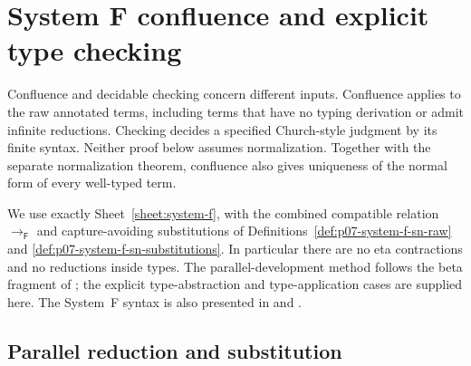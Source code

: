 \section{System F confluence and explicit type checking}
\label{sec:p07-system-f-confluence-and-checking}

Confluence and decidable checking concern different inputs. Confluence
applies to the raw annotated terms, including terms that have no typing
derivation or admit infinite reductions. Checking decides a specified
Church-style judgment by its finite syntax. Neither proof below assumes
normalization. Together with the separate normalization theorem, confluence
also gives uniqueness of the normal form of every well-typed term.

We use exactly Sheet~\ref{sheet:system-f}, with the combined compatible
relation \(\to_{\mathsf F}\) and capture-avoiding substitutions of
Definitions~\ref{def:p07-system-f-sn-raw} and
\ref{def:p07-system-f-sn-substitutions}. In particular there are no eta
contractions and no reductions inside types. The parallel-development
method follows the beta fragment of
\cite[Sections~4.3--4.4]{Selinger2013LambdaNotesV2}; the explicit
type-abstraction and type-application cases are supplied here.
The System~F syntax is also presented in
\cite[Sections~8.1--8.4]{Selinger2013LambdaNotesV2} and
\cite[Sections~11.1--11.2]{GirardLafontTaylor2003Web}.

\subsection{Parallel reduction and substitution}
\label{sec:p07-system-f-parallel}

